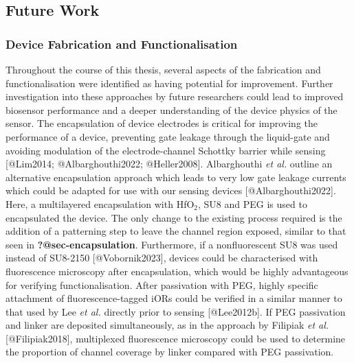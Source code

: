 \documentclass[
  letterpaper,
  DIV=11,
  numbers=noendperiod]{scrartcl}
\begin{document}
\hypertarget{sec-future-work}{%
\subsection{Future Work}\label{sec-future-work}}

\hypertarget{sec-future-work-fabrication}{%
\subsubsection{Device Fabrication and
Functionalisation}\label{sec-future-work-fabrication}}

Throughout the course of this thesis, several aspects of the fabrication
and functionalisation were identified as having potential for
improvement. Further investigation into these approaches by future
researchers could lead to improved biosensor performance and a deeper
understanding of the device physics of the sensor. The encapsulation of
device electrodes is critical for improving the performance of a device,
preventing gate leakage through the liquid-gate and avoiding modulation
of the electrode-channel Schottky barrier while sensing {[}@Lim2014;
@Albarghouthi2022; @Heller2008{]}. Albarghouthi \emph{et al.} outline an
alternative encapsulation approach which leads to very low gate leakage
currents which could be adapted for use with our sensing devices
{[}@Albarghouthi2022{]}. Here, a multilayered encapsulation with
HfO\(_2\), SU8 and PEG is used to encapsulated the device. The only
change to the existing process required is the addition of a patterning
step to leave the channel region exposed, similar to that seen in
\textbf{?@sec-encapsulation}. Furthermore, if a nonfluorescent SU8 was
used instead of SU8-2150 {[}@Vobornik2023{]}, devices could be
characterised with fluorescence microscopy after encapsulation, which
would be highly advantageous for verifying functionalisation. After
passivation with PEG, highly specific attachment of fluorescence-tagged
iORs could be verified in a similar manner to that used by Lee \emph{et
al.} directly prior to sensing {[}@Lee2012b{]}. If PEG passivation and
linker are deposited simultaneously, as in the approach by Filipiak
\emph{et al.} {[}@Filipiak2018{]}, multiplexed fluorescence microscopy
could be used to determine the proportion of channel coverage by linker
compared with PEG passivation.
\end{document}

